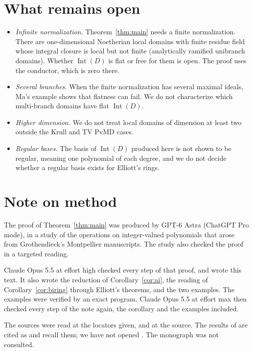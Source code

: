\documentclass[11pt,a4paper]{article}
\theoremstyle{plain}
\theoremstyle{remark}
\newcommand{\Int}{\operatorname{Int}}
\begin{document}
\section{What remains open}

\begin{itemize}
\item \emph{Infinite normalization.} Theorem~\ref{thm:main} needs a finite normalization. There are one-dimensional
Noetherian local domains with finite residue field whose integral closure is local but not finite (analytically
ramified unibranch domains). Whether $\Int(D)$ is flat or free for them is open. The proof uses the conductor, which
is zero there.
\item \emph{Several branches.} When the finite normalization has several maximal ideals, Ma's example shows that
flatness can fail. We do not characterize which multi-branch domains have flat $\Int(D)$.
\item \emph{Higher dimension.} We do not treat local domains of dimension at least two outside the Krull and TV PvMD
cases.
\item \emph{Regular bases.} The basis of $\Int(D)$ produced here is not shown to be regular, meaning one polynomial
of each degree, and we do not decide whether a regular basis exists for Elliott's rings.
\end{itemize}

\section*{Note on method}
The proof of Theorem~\ref{thm:main} was produced by GPT-6 Astra (ChatGPT Pro mode), in a study of the operations on
integer-valued polynomials that arose from Grothendieck's Montpellier manuscripts. The study also checked the proof
in a targeted reading.

Claude Opus 5.5 at effort high checked every step of that proof, and wrote this text. It also wrote the reduction
of Corollary~\ref{cor:ai}, the reading of Corollary~\ref{cor:biring} through Elliott's theorems, and the two
examples. The examples were verified by an exact program. Claude Opus 5.5 at effort max then checked every step of the
note again, the corollary and the examples included.

The sources \cite{CFFG,E11a,E11b,E16b,Ma,JLSWXY} were read at the locators given, and \cite[Tag~032Y]{Stacks} at
the source. The results of \cite{E07,E10} are cited as \cite[pp.~9--10]{CFFG} and \cite[p.~16]{E11b} recall them;
we have not opened \cite{E07,E10}. The monograph \cite{CC} was not consulted.
\end{document}
